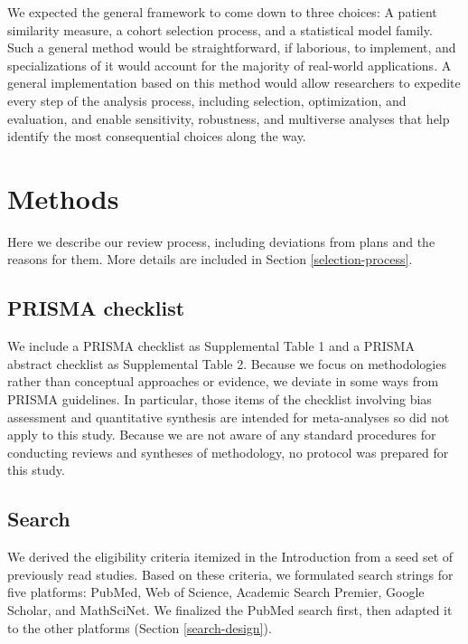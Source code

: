 \documentclass[preprint, 3p,
authoryear]{elsarticle} %
\begin{document}
We expected the general framework to come down to three choices: A
patient similarity measure, a cohort selection process, and a
statistical model family. Such a general method would be
straightforward, if laborious, to implement, and specializations of it
would account for the majority of real-world applications. A general
implementation based on this method would allow researchers to expedite
every step of the analysis process, including selection, optimization,
and evaluation, and enable sensitivity, robustness, and multiverse
analyses that help identify the most consequential choices along the
way.

\hypertarget{methods}{%
\section{Methods}\label{methods}}

Here we describe our review process, including deviations from plans and
the reasons for them. More details are included in Section
\ref{selection-process}.

\hypertarget{prisma-checklist}{%
\subsection{PRISMA checklist}\label{prisma-checklist}}

We include a PRISMA checklist as Supplemental Table 1 and a PRISMA
abstract checklist as Supplemental Table 2. Because we focus on
methodologies rather than conceptual approaches or evidence, we deviate
in some ways from PRISMA guidelines. In particular, those items of the
checklist involving bias assessment and quantitative synthesis are
intended for meta-analyses so did not apply to this study. Because we
are not aware of any standard procedures for conducting reviews and
syntheses of methodology, no protocol was prepared for this study.

\hypertarget{search}{%
\subsection{Search}\label{search}}

We derived the eligibility criteria itemized in the Introduction from a
seed set of previously read studies. Based on these criteria, we
formulated search strings for five platforms: PubMed, Web of Science,
Academic Search Premier, Google Scholar, and MathSciNet. We finalized
the PubMed search first, then adapted it to the other platforms (Section
\ref{search-design}).
\end{document}
